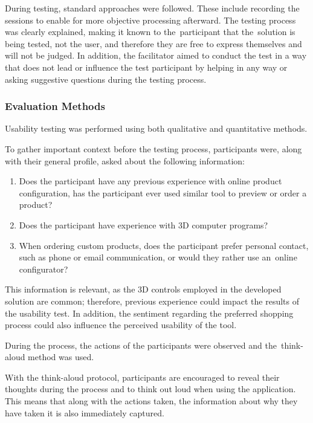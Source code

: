 During testing, standard approaches were followed. These include recording the sessions to enable for more objective processing afterward. The testing process was clearly explained, making it known to the~participant that the~solution is being tested, not the user, and therefore they are free to express themselves and will not be judged. In addition, the facilitator aimed to conduct the test in a way that does not lead or influence the test participant by helping in any way or asking suggestive questions during the testing process.~\cite{Moran2019}


\subsubsection{Evaluation Methods}

Usability testing was performed using both qualitative and quantitative methods.

To gather important context before the testing process, participants were, along with their general profile, asked about the following information: 
\begin{enumerate}
    \item Does the participant have any previous experience with online product configuration, has the participant ever used similar tool to preview or order a product?
    \item Does the participant have experience with 3D computer programs?
    \item When ordering custom products, does the participant prefer personal contact, such as phone or email communication, or would they rather use an~online configurator?
\end{enumerate}
This information is relevant, as the 3D controls employed in the developed solution are common; therefore, previous experience could impact the results of the usability test. In addition, the sentiment regarding the preferred shopping process could also influence the perceived usability of the tool.

During the process, the actions of the participants were observed and the~think-aloud method was used.

With the think-aloud protocol, participants are encouraged to reveal their thoughts during the process and to think out loud when using the application. This means that along with the actions taken, the information about why they have taken it is also immediately captured.~\cite{Moran2019}


